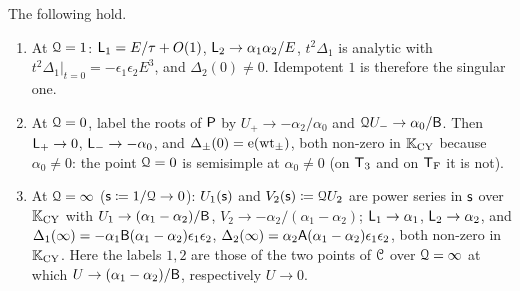 \begin{lem}[{\Lref{Lemma~2.14}: behaviour at $\cQ=1$, $\cQ=0$, $\cQ=\infty$}]
\label{lem:set-limits}
The following hold.
\begin{enumerate}
\item At $\cQ=1$: $\mathsf{L}_1=E/\tau+O(1)$, $\mathsf{L}_2\to\alpha_1\alpha_2/E$, $t^2\Delta_1$ is analytic with $t^2\Delta_1|_{t=0}=-\epsilon_1\epsilon_2E^3$, and $\Delta_2(0)\neq0$. Idempotent $1$ is therefore the singular one.
\item At $\cQ=0$, label the roots of $\mathsf{P}$ by $U_+\to-\alpha_2/\alpha_0$ and $\mathcal{Q} U_-\to\alpha_0/\mathsf{B}$. Then $\mathsf{L}_+\to0$, $\mathsf{L}_-\to-\alpha_0$, and $\Delta_\pm(0)=\mathrm{e}(\mathrm{wt}_\pm)$, both non-zero in $\mathbb{K}_{\mathrm{CY}}$ because $\alpha_0\neq0$: the point $\cQ=0$ is semisimple at $\alpha_0\neq0$ (on $\mathsf{T}_{3}$ and on $\mathsf{T}_{\mathrm{F}}$ it is not).
\item At $\cQ=\infty$ ($\mathsf{s}\coloneqq1/\mathcal{Q}\to0$): $U_1(\mathsf{s})$ and $V_2(\mathsf{s})\coloneqq\mathcal{Q} U_2$ are power series in $\mathsf{s}$ over $\mathbb{K}_{\mathrm{CY}}$ with $U_1\to(\alpha_1-\alpha_2)/\mathsf{B}$, $V_2\to-\alpha_2/(\alpha_1-\alpha_2)$; $\mathsf{L}_1\to\alpha_1$, $\mathsf{L}_2\to\alpha_2$, and $\Delta_1(\infty)=-\alpha_1\mathsf{B}(\alpha_1-\alpha_2)\epsilon_1\epsilon_2$, $\Delta_2(\infty)=\alpha_2\mathsf{A}(\alpha_1-\alpha_2)\epsilon_1\epsilon_2$, both non-zero in $\mathbb{K}_{\mathrm{CY}}$. Here the labels $1,2$ are those of the two points of $\mathcal{C}$ over $\cQ=\infty$ at which $U\to(\alpha_1-\alpha_2)/\mathsf{B}$, respectively $U\to0$.
\end{enumerate}
\end{lem}
